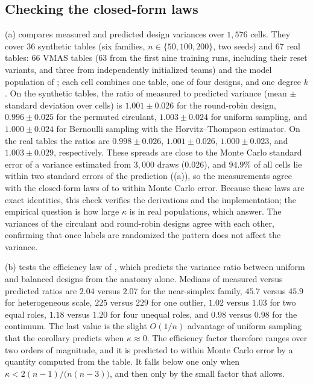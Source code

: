 \documentclass[twoside,11pt]{article}
\begin{document}
\subsection{Checking the closed-form laws}
\label{sec:exp-laws}

(a) compares measured and predicted design variances over
$1{,}576$ cells. They cover $36$ synthetic tables (six families,
$n\in\{50,100,200\}$, two seeds) and $67$ real tables: $66$ VMAS tables
($63$ from the first nine training runs, including their reset variants,
and three from independently initialized teams) and the model population
of ; each cell combines one table, one of four designs, and one degree $k$. On the synthetic tables, the ratio of measured to predicted
variance (mean $\pm$ standard deviation over cells) is ${1.001\pm0.026}$ for
the round-robin design, ${0.996\pm0.025}$ for the permuted circulant,
${1.003\pm0.024}$ for uniform sampling, and ${1.000\pm0.024}$ for Bernoulli
sampling with the Horvitz--Thompson estimator. On the real tables the
ratios are ${0.998\pm0.026}$, ${1.001\pm0.026}$, ${1.000\pm0.023}$, and
${1.003\pm0.029}$, respectively. These spreads are close to the Monte Carlo
standard error of a variance estimated from $3{,}000$ draws ($0.026$), and
$94.9\%$ of all cells lie within two standard errors of the prediction
((a)), so the measurements agree with the closed-form laws of
 to within Monte Carlo error.
Because these laws are exact identities, this check verifies the derivations
and the implementation; the empirical question is how large $\kappa$ is in
real populations, which 
answer. The variances of the circulant and round-robin designs agree with each other,
confirming that once labels are randomized the pattern does not affect the
variance.

(b) tests the efficiency law of , which
predicts the variance ratio between uniform and balanced designs from the
anatomy alone. Medians of measured versus predicted ratios are $2.04$ versus
$2.07$ for the near-simplex family, $45.7$ versus $45.9$ for heterogeneous
scale, $225$ versus $229$ for one outlier, $1.02$ versus $1.03$ for two equal
roles, $1.18$ versus $1.20$ for four unequal roles, and $0.98$ versus $0.98$
for the continuum. The last value is the slight $O(1/n)$ advantage of
uniform sampling that the corollary predicts when $\kappa\approx 0$. The
efficiency factor therefore ranges over two orders of magnitude, and it is
predicted to within Monte Carlo error by a quantity computed from the
table. It falls below one only when $\kappa<2(n-1)/\bigl(n(n-3)\bigr)$, and then only by
the small factor that  allows.
\end{document}
